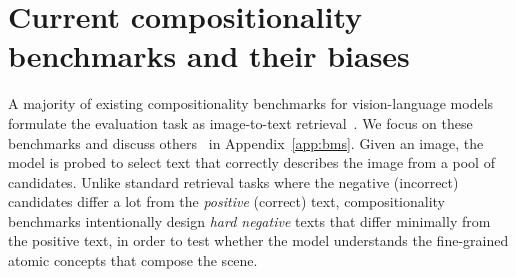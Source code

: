\section{Current compositionality benchmarks and their biases}

A majority of existing compositionality benchmarks for vision-language models formulate the evaluation task as image-to-text retrieval~\cite{zhao2022vl,yuksekgonul2023when,ma2022crepe}. We focus on these benchmarks and discuss others~\cite{thrush2022winoground,ray2023cola} in Appendix~\ref{app:bms}.
Given an image, the model is probed to select text that correctly describes the image from a pool of candidates.
Unlike standard retrieval tasks where the negative (incorrect) candidates differ a lot from the \emph{positive} (correct) text, compositionality benchmarks intentionally design \emph{hard negative} texts that differ minimally from the positive text, in order to test whether the model understands the fine-grained atomic concepts that compose the scene.


% 



